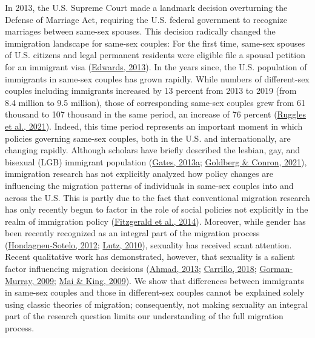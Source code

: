 \documentclass[
  11pt,
]{article}
\begin{document}
In 2013, the U.S. Supreme Court made a landmark decision overturning the Defense of Marriage Act, requiring the U.S. federal government to recognize marriages between same-sex spouses. This decision radically changed the immigration landscape for same-sex couples: For the first time, same-sex spouses of U.S. citizens and legal permanent residents were eligible file a spousal petition for an immigrant visa (\protect\hyperlink{ref-edwards_2013}{Edwards, 2013}). In the years since, the U.S. population of immigrants in same-sex couples has grown rapidly. While numbers of different-sex couples including immigrants increased by 13 percent from 2013 to 2019 (from 8.4 million to 9.5 million), those of corresponding same-sex couples grew from 61 thousand to 107 thousand in the same period, an increase of 76 percent (\protect\hyperlink{ref-ruggles_2021}{Ruggles et al., 2021}). Indeed, this time period represents an important moment in which policies governing same-sex couples, both in the U.S. and internationally, are changing rapidly. Although scholars have briefly described the lesbian, gay, and bisexual (LGB) immigrant population (\protect\hyperlink{ref-gates_2013}{Gates, 2013a}; \protect\hyperlink{ref-goldberg_2021}{Goldberg \& Conron, 2021}), immigration research has not explicitly analyzed how policy changes are influencing the migration patterns of individuals in same-sex couples into and across the U.S. This is partly due to the fact that conventional migration research has only recently begun to factor in the role of social policies not explicitly in the realm of immigration policy (\protect\hyperlink{ref-fitzgerald_2014}{Fitzgerald et al., 2014}). Moreover, while gender has been recently recognized as an integral part of the migration process (\protect\hyperlink{ref-hondagneu-sotelo_2012}{Hondagneu-Sotelo, 2012}; \protect\hyperlink{ref-lutz_2010}{Lutz, 2010}), sexuality has received scant attention. Recent qualitative work has demonstrated, however, that sexuality is a salient factor influencing migration decisions (\protect\hyperlink{ref-ahmad_2013}{Ahmad, 2013}; \protect\hyperlink{ref-carrillo_2018}{Carrillo, 2018}; \protect\hyperlink{ref-gorman-murray_2009}{Gorman-Murray, 2009}; \protect\hyperlink{ref-mai_2009}{Mai \& King, 2009}). We show that differences between immigrants in same-sex couples and those in different-sex couples cannot be explained solely using classic theories of migration; consequently, not making sexuality an integral part of the research question limits our understanding of the full migration process.
\end{document}
